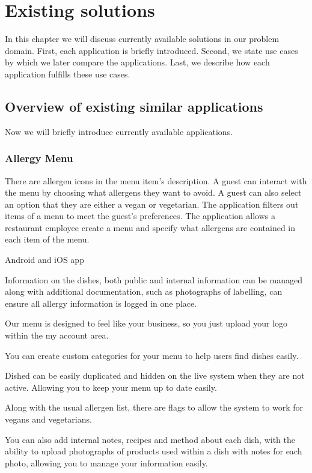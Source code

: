 \chapter{Existing solutions}
In this chapter we will discuss currently available solutions in our problem domain.
First, each application is briefly introduced.
Second, we state use cases by which we later compare the applications.
Last, we describe how each application fulfills these use cases.

\section{Overview of existing similar applications}
Now we will briefly introduce currently available applications.


\subsection*{Allergy Menu}
  There are allergen icons in the menu item's description.
  A guest can interact with the menu by choosing what allergens they want to avoid.
  A guest can also select an option that they are either a vegan or vegetarian.
  The application filters out items of a menu to meet the guest's preferences.
  The application allows a restaurant employee create a menu and specify what allergens are contained in each item of the menu.

  Android and iOS app

  Information on the dishes, both public and internal information can be managed along with additional documentation, such as photographs of labelling, can ensure all allergy information is logged in one place.

  Our menu is designed to feel like your business, so you just upload your logo within the my account area.

  You can create custom categories for your menu to help users find dishes easily.

  Dished can be easily duplicated and hidden on the live system when they are not active. Allowing you to keep your menu up to date easily.

  Along with the usual allergen list, there are flags to allow the system to work for vegans and vegetarians.

  You can also add internal notes, recipes and method about each dish, with the ability to upload photographs of products used within a dish with notes for each photo, allowing you to manage your information easily.

